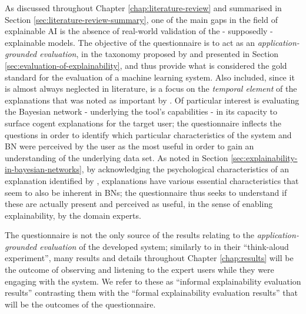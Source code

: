As discussed throughout Chapter \ref{chap:literature-review} and summarised in Section \ref{sec:literature-review-summary}, one of the main gaps in the field of explainable AI is the absence of real-world validation of the - supposedly - explainable models.
The objective of the questionnaire is to act as an \textit{application-grounded evaluation}, in the taxonomy proposed by \citet{doshi2017towards} and presented in Section \ref{sec:evaluation-of-explainability}, and thus provide what is considered the gold standard for the evaluation of a machine learning system.
Also included, since it is almost always neglected in literature, is a focus on the \textit{temporal element} of the explanations that was noted as important by \citet{gilpin2018explaining}.
Of particular interest is evaluating the Bayesian network - underlying the tool's capabilities - in its capacity to surface cogent explanations for the target user; the questionnaire inflects the questions in order to identify which particular characteristics of the system and BN were perceived by the user as the most useful in order to gain an understanding of the underlying data set.
As noted in Section \ref{sec:explainability-in-bayesian-networks}, by acknowledging the psychological characteristics of an explanation identified by \citet{miller2018explanation}, explanations have various essential characteristics that seem to also be inherent in BNs; the questionnaire thus seeks to understand if these are actually present and perceived as useful, in the sense of enabling explainability, by the domain experts.

The questionnaire is not the only source of the results relating to the \textit{application-grounded evaluation} of the developed system; similarly to \citep{stumpf2009interacting} in their \enquote{think-aloud experiment}, many results and details throughout Chapter \ref{chap:results} will be the outcome of observing and listening to the expert users while they were engaging with the system.
We refer to these as \enquote{informal explainability evaluation results} contrasting them with the \enquote{formal explainability evaluation results} that will be the outcomes of the questionnaire.